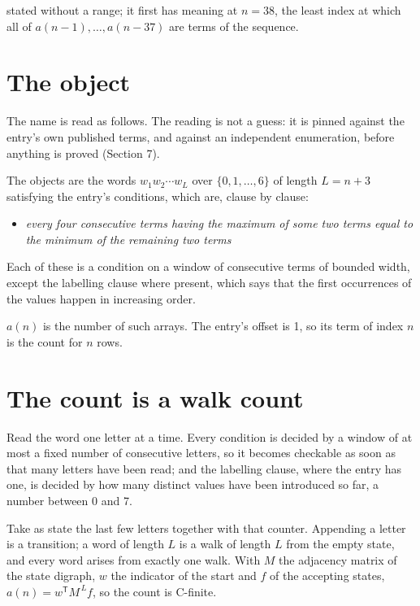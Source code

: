 \documentclass[11pt]{article}
\theoremstyle{definition}
\begin{document}
stated without a range; it first has meaning at $n = 38$, the least index at which all of $a(n-1),\dots,a(n-37)$ are terms of the sequence.

\section{The object}

The name is read as follows. The reading is not a guess: it is pinned against the entry's own published terms, and against an independent enumeration, before anything is proved (Section 7).

The objects are the words $w_1 w_2 \cdots w_L$ over $\{0,1,\dots,6\}$ of length $L = n + 3$ satisfying the entry's conditions, which are, clause by clause:

\begin{itemize}

\item {\itshape every four consecutive terms having the maximum of some two terms equal to the minimum of the remaining two terms}

\end{itemize}

Each of these is a condition on a window of consecutive terms of bounded width, except the labelling clause where present, which says that the first occurrences of the values happen in increasing order.

$a(n)$ is the number of such arrays. The entry's offset is 1, so its term of index $n$ is the count for $n$ rows.

\section{The count is a walk count}

Read the word one letter at a time. Every condition is decided by a window of at most a fixed number of consecutive letters, so it becomes checkable as soon as that many letters have been read; and the labelling clause, where the entry has one, is decided by how many distinct values have been introduced so far, a number between $0$ and 7.

Take as state the last few letters together with that counter. Appending a letter is a transition; a word of length $L$ is a walk of length $L$ from the empty state, and every word arises from exactly one walk. With $M$ the adjacency matrix of the state digraph, $w$ the indicator of the start and $f$ of the accepting states, $a(n) = w^{\mathsf T}M^{\,L}f$, so the count is C-finite.
\end{document}
